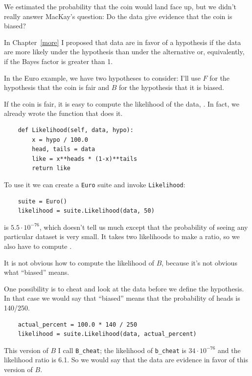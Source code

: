 \documentclass[12pt]{book}
\begin{document}
We estimated the probability that the coin would
land face up, but we didn't really answer MacKay's question:
Do the data give evidence that the coin is biased?

In Chapter~\ref{more} I proposed that data are in favor of
a hypothesis if the data are more likely under the hypothesis than
under the alternative or, equivalently, if the Bayes factor is greater
than 1.

In the Euro example, we have two hypotheses to consider: I'll use
$F$ for the hypothesis that the coin is fair and $B$ for the hypothesis
that it is biased.

If the coin is fair, it is easy to compute the likelihood of the
data, .  In fact, we already wrote the function
that does it.

\begin{verbatim}
    def Likelihood(self, data, hypo):
        x = hypo / 100.0
        head, tails = data
        like = x**heads * (1-x)**tails
        return like
\end{verbatim}

To use it we can
create a {\tt Euro} suite and invoke
{\tt Likelihood}:

\begin{verbatim}
    suite = Euro()
    likelihood = suite.Likelihood(data, 50)
\end{verbatim}

 is $5.5 \cdot 10^{-76}$, which doesn't tell us much except
that the probability of seeing any particular dataset is very small.
It takes two likelihoods to make a ratio, so we also have to
compute .

It is not obvious how to compute the likelihood of $B$, because
it's not obvious what ``biased'' means.

One possibility is to cheat and look at the data before we define
the hypothesis.  In that case we would say that ``biased'' means that
the probability of heads is 140/250.

\begin{verbatim}
    actual_percent = 100.0 * 140 / 250
    likelihood = suite.Likelihood(data, actual_percent)
\end{verbatim}

This version of $B$ I call \verb"B_cheat"; the likelihood of
\verb"b_cheat" is $34 \cdot 10^{-76}$ and the likelihood ratio is
6.1.  So we would say that the data are evidence in favor of this
version of $B$.
\end{document}
